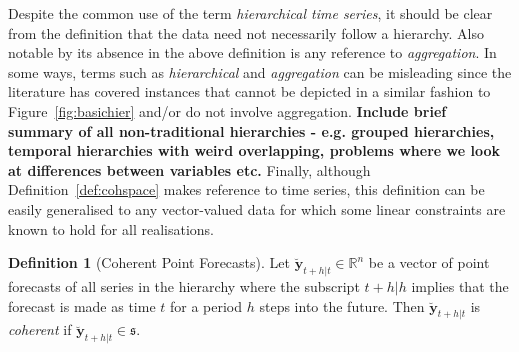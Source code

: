 \documentclass[12pt]{article}
\theoremstyle{definition}
\newtheorem{definition}{Definition}[section]
\theoremstyle{property}
\begin{document}
	 Despite the common use of the term {\em hierarchical time series}, it should be clear from the definition that the data need not necessarily follow a hierarchy.  Also notable by its absence in the above definition is any reference to {\em aggregation}. In some ways, terms such as {\em hierarchical} and {\em aggregation} can be misleading since the literature has covered instances that cannot be depicted in a similar fashion to Figure~\ref{fig:basichier} and/or do not involve aggregation. {\bf Include brief summary of all non-traditional hierarchies - e.g. grouped hierarchies, temporal hierarchies with weird overlapping, problems where we look at differences between variables etc.}  Finally, although Definition~\ref{def:cohspace} makes reference to time series, this definition can be easily generalised to any vector-valued data for which some linear constraints are known to hold for all realisations.
	 
	 
	 
	
%	
	
	\begin{definition}[Coherent Point Forecasts]\label{def:cohpoint}
		Let $\breve{\bm{y}}_{t+h|t} \in \mathbb{R}^n$ be a vector of point forecasts of all series in the hierarchy where the subscript $t+h|h$ implies that the forecast is made as time $t$ for a period $h$ steps into the future. Then $\breve{\bm{y}}_{t+h|t}$ is \emph{coherent} if $\breve{\bm{y}}_{t+h|t} \in \mathfrak{s}$.
	\end{definition}
\end{document}
